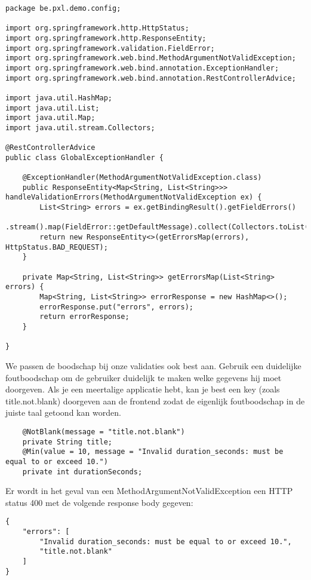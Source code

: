 \begin{lstlisting}
package be.pxl.demo.config;

import org.springframework.http.HttpStatus;
import org.springframework.http.ResponseEntity;
import org.springframework.validation.FieldError;
import org.springframework.web.bind.MethodArgumentNotValidException;
import org.springframework.web.bind.annotation.ExceptionHandler;
import org.springframework.web.bind.annotation.RestControllerAdvice;

import java.util.HashMap;
import java.util.List;
import java.util.Map;
import java.util.stream.Collectors;

@RestControllerAdvice
public class GlobalExceptionHandler {

	@ExceptionHandler(MethodArgumentNotValidException.class)
	public ResponseEntity<Map<String, List<String>>> handleValidationErrors(MethodArgumentNotValidException ex) {
		List<String> errors = ex.getBindingResult().getFieldErrors()
				.stream().map(FieldError::getDefaultMessage).collect(Collectors.toList());
		return new ResponseEntity<>(getErrorsMap(errors), HttpStatus.BAD_REQUEST);
	}

	private Map<String, List<String>> getErrorsMap(List<String> errors) {
		Map<String, List<String>> errorResponse = new HashMap<>();
		errorResponse.put("errors", errors);
		return errorResponse;
	}

}

\end{lstlisting}

We passen de boodschap bij onze validaties ook best aan.  Gebruik een duidelijke foutboodschap om de gebruiker duidelijk te maken welke gegevens hij moet doorgeven.
Als je een meertalige applicatie hebt, kan je best een key (zoals title.not.blank) doorgeven aan de frontend zodat de eigenlijk foutboodschap in de juiste taal getoond kan worden.


\begin{lstlisting}
	@NotBlank(message = "title.not.blank")
	private String title;
	@Min(value = 10, message = "Invalid duration_seconds: must be equal to or exceed 10.")
	private int durationSeconds;
\end{lstlisting}

Er wordt in het geval van een MethodArgumentNotValidException een HTTP status 400 met de volgende response body gegeven:
\begin{verbatim}
{
	"errors": [
		"Invalid duration_seconds: must be equal to or exceed 10.",
		"title.not.blank"
	]
}
\end{verbatim}


\begin{oefening}

\end{oefening}

